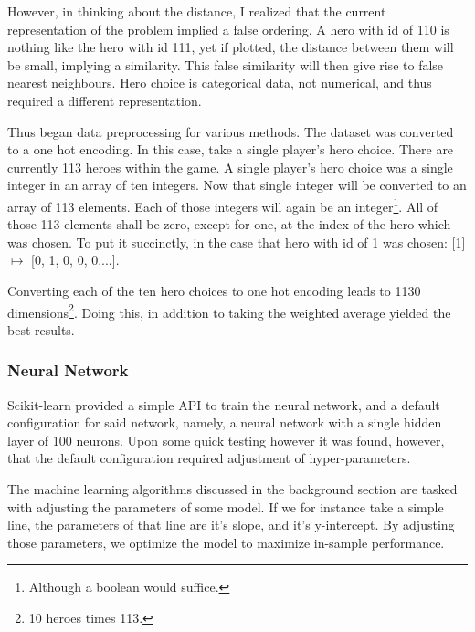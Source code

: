\documentclass[a4paper, 12pt]{article}
\begin{document}
                     \par However, in thinking about the distance, I realized that the current representation of the problem implied a false ordering. A hero with id of 110 is nothing like the hero with id 111, yet if plotted, the distance between them will be small, implying a similarity. This false similarity will then give rise to false nearest neighbours. Hero choice is categorical data, not numerical, and thus required a different representation. 
                     
                     \par Thus began data preprocessing for various methods. The dataset was converted to a one hot encoding\cite{oneHotEncoding}. In this case, take a single player's hero choice. There are currently 113 heroes within the game\cite{dota2Heroes}. A single player's hero choice was a single integer in an array of ten integers. Now that single integer will be converted to an array of 113 elements. Each of those integers will again be an integer\footnote{Although a boolean would suffice.}. All of those 113 elements shall be zero, except for one, at the index of the hero which was chosen. To put it succinctly, in the case that hero with id of 1 was chosen: [1] \(\mapsto\) [0, 1, 0, 0, 0....].
                     
                     \par Converting each of the ten hero choices to one hot encoding leads to 1130 dimensions\footnote{10 heroes times 113.}. Doing this, in addition to taking the weighted average yielded the best results.
                     
                 \subsubsection{Neural Network}
                 
                     \par Scikit-learn provided a simple API to train the neural network, and a default configuration for said network, namely, a neural network with a single hidden layer of 100 neurons. Upon some quick testing however it was found, however, that the default configuration required adjustment of hyper-parameters.
                     
                     \par The machine learning algorithms discussed in the background section are tasked with adjusting the parameters of some model. If we for instance take a simple line, the parameters of that line are it's slope, and it's y-intercept. By adjusting those parameters, we optimize the model to maximize in-sample performance.
                     
\end{document}
